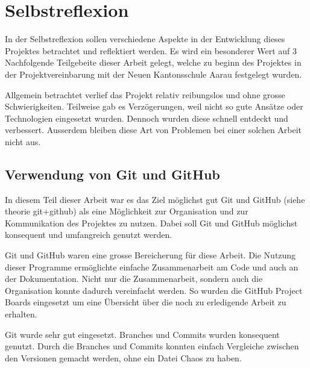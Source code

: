 



\section{Selbstreflexion}
In der Selbstreflexion sollen verschiedene Aspekte in der Entwicklung dieses
Projektes betrachtet und reflektiert werden. Es wird ein besonderer Wert auf 3
Nachfolgende Teilgebeite dieser Arbeit gelegt, welche zu beginn des Projektes in
der Projektvereinbarung mit der Neuen Kantonsschule Aarau festgelegt wurden.

Allgemein betrachtet verlief das Projekt relativ reibungslos und ohne grosse
Schwierigkeiten. Teilweise gab es Verzögerungen, weil nicht so gute Ansätze oder
Technologien eingesetzt wurden. Dennoch wurden diese schnell entdeckt und
verbessert. Ausserdem bleiben diese Art von Problemen bei einer solchen Arbeit
nicht aus.


\subsection*{Verwendung von Git und GitHub}
In diesem Teil dieser Arbeit war es das Ziel möglichst gut Git und GitHub (siehe
theorie git+github)  %
als eine Möglichkeit zur Organisation und zur Kommunikation des Projektes zu
nutzen. Dabei soll Git und GitHub möglichst konsequent und umfangreich genutzt
werden.

Git und GitHub waren eine grosse Bereicherung für diese Arbeit. Die
Nutzung dieser Programme ermöglichte einfache Zusammenarbeit am Code und auch an
der Dokumentation. Nicht nur die Zusammenarbeit, sondern auch die Organisation
konnte dadurch vereinfacht werden. So wurden die GitHub Project Boards
eingesetzt um eine Übersicht über die noch zu erledigende Arbeit zu erhalten.

Git wurde sehr gut eingesetzt. Branches und Commits wurden konsequent genutzt.
Durch die Branches und Commits konnten einfach Vergleiche zwischen den Versionen
gemacht werden, ohne ein Datei Chaos zu haben.

